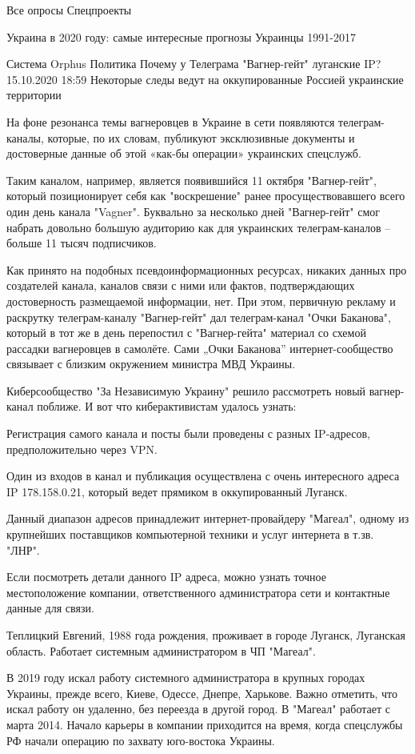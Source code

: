 Все опросы
Спецпроекты

    Украина в 2020 году: самые интересные прогнозы
    Украинцы 1991-2017

Система Orphus
Политика
Почему у Телеграма "Вагнер-гейт" луганские IP?
15.10.2020 18:59
Некоторые следы ведут на оккупированные Россией украинские территории

На фоне резонанса темы вагнеровцев в Украине в сети появляются телеграм-каналы, которые, по их словам, публикуют эксклюзивные документы и достоверные данные об этой «как-бы операции» украинских спецслужб.

Таким каналом, например, является появившийся 11 октября "Вагнер-гейт", который позиционирует себя как "воскрешение" ранее просуществовавшего всего один день канала "Vagner". Буквально за несколько дней "Вагнер-гейт" смог набрать довольно большую аудиторию как для украинских телеграм-каналов – больше 11 тысяч подписчиков.

Как принято на подобных псевдоинформационных ресурсах, никаких данных про создателей канала, каналов связи с ними или фактов, подтверждающих достоверность размещаемой информации, нет. При этом, первичную рекламу и раскрутку телеграм-каналу "Вагнер-гейт" дал телеграм-канал "Очки Баканова", который в тот же в день перепостил с "Вагнер-гейта" материал со схемой рассадки вагнеровцев в самолёте. Сами „Очки Баканова” интернет-сообщество связывает с близким окружением министра МВД Украины.

Киберсообщество "За Независимую Украину" решило рассмотреть новый вагнер-канал поближе. И вот что киберактивистам удалось узнать:

Регистрация самого канала и посты были проведены с разных IP-адресов, предположительно через VPN.

Один из входов в канал и публикация осуществлена с очень интересного адреса IP 178.158.0.21, который ведет прямиком в оккупированный Луганск.

Данный диапазон адресов принадлежит интернет-провайдеру "Магеал", одному из крупнейших поставщиков компьютерной техники и услуг интернета в т.зв. "ЛНР".

Если посмотреть детали данного IP адреса, можно узнать точное местоположение компании, ответственного администратора сети и контактные данные для связи.

Теплицкий Евгений, 1988 года рождения, проживает в городе Луганск, Луганская область. Работает системным администратором в ЧП "Магеал".

В 2019 году искал работу системного администратора в крупных городах Украины, прежде всего, Киеве, Одессе, Днепре, Харькове. Важно отметить, что искал работу он удаленно, без переезда в другой город. В "Магеал" работает с марта 2014. Начало карьеры в компании приходится на время, когда спецслужбы РФ начали операцию по захвату юго-востока Украины.

